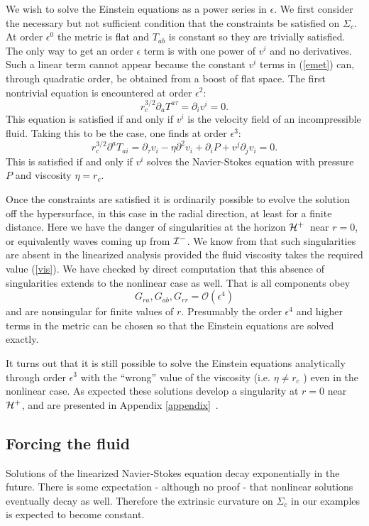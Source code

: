 \documentclass{article}
\def\beq{\begin{equation}}
\def\eeq{\end{equation}}
\def\p{\partial}
\def\e{{\epsilon}}
\def\im{${\cal I}^-$}
\def\sc{$\Sigma_c$}
\def\cO{\mathcal{O}}
\def\hp{${\cal H}^+$}
\begin{document}
We wish to solve the Einstein equations as a power series in $\e$.  We first consider the necessary but not sufficient condition that the constraints be satisfied on \sc. At order $\e^0$ the metric is flat and $T_{ab}$ is constant so they are trivially satisfied.   The only way to get an order $\e$ term is with one power of $v^i$ and no derivatives.
Such a linear term cannot appear because the constant $v^i$ terms in (\ref{emet}) can, through quadratic order, be obtained from a boost of flat space. The first nontrivial equation is encountered at order $\e^2$:
%
\beq
r_c^{3/2} \p_a T^{a\tau}=\p_iv^i=0 .
\eeq
%
This equation is satisfied if and only if  $v^i$ is the velocity field of an incompressible fluid. Taking this to be the case,  one finds at order $\e^3$:
%
\beq
r_c^{3/2} \p^a T_{ai}=\p_\tau v_i-\eta \p^2v_i+\p_iP+v^j\p_j v_i =0.
\eeq
%
This is satisfied if and only if $v^i$ solves the  Navier-Stokes equation with pressure $P$ and viscosity $\eta=r_c$.

Once the constraints are satisfied it is ordinarily possible to evolve the solution off the hypersurface, in this case in the radial direction, at least for a finite distance. Here we have the danger of
singularities at the horizon \hp\ near $r=0$, or equivalently waves coming up from \im. We know from \cite{bkls} that such singularities are absent in the linearized analysis provided the fluid viscosity takes the required value (\ref{vis}).  We have checked by direct computation that this absence of singularities extends to the nonlinear case as well.  That is all components obey
%
\beq
 \label{fcv} G_{ra},G_{ab},G_{rr}=\cO (\e^4)
\eeq
%
and are nonsingular for finite values of $r$.
Presumably the order $\e^4$ and higher terms in the metric can be chosen so that the Einstein equations are solved exactly.


It turns out that it is still possible to solve the Einstein equations analytically through order $\e^3$ with the ``wrong'' value of the viscosity (i.e. $\eta\neq r_c$ ) even in the nonlinear case. As expected these solutions develop a singularity at $r=0$ near \hp, and are presented in Appendix \ref{appendix}\ .
%
%
%
%
\subsection{Forcing the fluid}

Solutions of the linearized Navier-Stokes equation decay exponentially in the future.
There is some expectation - although no proof - that nonlinear solutions eventually decay as well. Therefore the extrinsic curvature on $\Sigma_c$ in our examples is expected to become constant.
\end{document}

